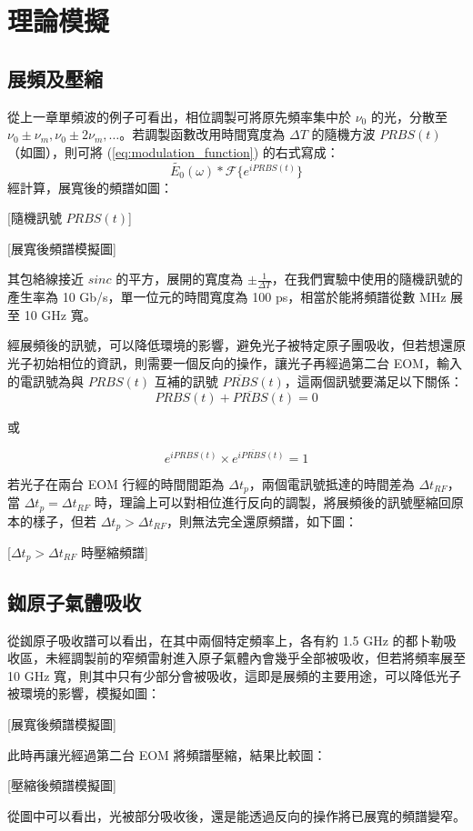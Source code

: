 \documentclass[class=NCU_thesis, crop=false]{standalone}
\begin{document}
\chapter{理論模擬}
\section{展頻及壓縮}
從上一章單頻波的例子可看出，相位調製可將原先頻率集中於 $\nu_{0}$ 的光，分散至 $\nu_{0}\pm\nu_{m}, \nu_{0}\pm2\nu_{m},\dots$。若調製函數改用時間寬度為 $\Delta T$ 的隨機方波 $PRBS(t)$ （如圖），則可將 (\ref{eq:modulation_function}) 的右式寫成：
\begin{equation}
    \tilde{E_{0}}(\omega)*\mathscr{F}\{{e^{i PRBS(t)}}\}
\end{equation}
經計算，展寬後的頻譜如圖：

[隨機訊號 $PRBS(t)$]

[展寬後頻譜模擬圖]

其包絡線接近 $sinc$ 的平方，展開的寬度為 $\pm\frac{1}{\Delta T}$，在我們實驗中使用的隨機訊號的產生率為 10 Gb/s，單一位元的時間寬度為 100 ps，相當於能將頻譜從數 MHz 展至 10 GHz 寬。

經展頻後的訊號，可以降低環境的影響，避免光子被特定原子團吸收，但若想還原光子初始相位的資訊，則需要一個反向的操作，讓光子再經過第二台 EOM，輸入的電訊號為與 $PRBS(t)$ 互補的訊號 $\overline{PRBS}(t)$，這兩個訊號要滿足以下關係：
\begin{equation}
    PRBS(t)+\overline{PRBS}(t)=0
\end{equation}

或

\begin{equation}
    e^{i PRBS(t)}\times e^{i \overline{PRBS}(t)}=1
\end{equation}

若光子在兩台 EOM 行經的時間間距為 $\Delta t_{p}$，兩個電訊號抵達的時間差為 $\Delta t_{RF}$，當 $\Delta t_{p}=\Delta t_{RF}$ 時，理論上可以對相位進行反向的調製，將展頻後的訊號壓縮回原本的樣子，但若 $\Delta t_{p}>\Delta t_{RF}$，則無法完全還原頻譜，如下圖：

[$\Delta t_{p}>\Delta t_{RF}$ 時壓縮頻譜]

\section{銣原子氣體吸收}
從銣原子吸收譜可以看出，在其中兩個特定頻率上，各有約 1.5 GHz 的都卜勒吸收區，未經調製前的窄頻雷射進入原子氣體內會幾乎全部被吸收，但若將頻率展至 10 GHz 寬，則其中只有少部分會被吸收，這即是展頻的主要用途，可以降低光子被環境的影響，模擬如圖：

[展寬後頻譜模擬圖]

此時再讓光經過第二台 EOM 將頻譜壓縮，結果比較圖：

[壓縮後頻譜模擬圖]

從圖中可以看出，光被部分吸收後，還是能透過反向的操作將已展寬的頻譜變窄。
\end{document}
